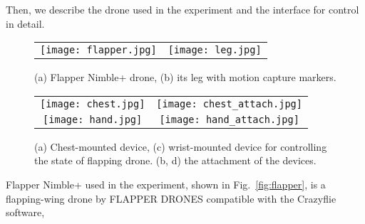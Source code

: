 Then, we describe the drone used in the experiment and the interface for control in detail.
\begin{figure}[b]
  \centering
  \begin{tabular}{cc}
      \begin{minipage}[t]{0.4 \columnwidth}
        \centering
        \texttt{[image: flapper.jpg]}
        \subcaption{}
        \label{fig:flapper}
      \end{minipage} &
      \begin{minipage}[t]{0.4 \columnwidth}
        \centering
        \texttt{[image: leg.jpg]}
        \subcaption{}
        \label{fig:leg}
      \end{minipage}
    \end{tabular}
  \caption{(a) Flapper Nimble+ drone, (b) its leg with motion capture markers.}
\end{figure}
\begin{figure}[!b]
  \centering
  \begin{tabular}{cc}
      \begin{minipage}[t]{0.4 \columnwidth}
        \centering
        \texttt{[image: chest.jpg]}
        \subcaption{}
        \label{fig:chest}
      \end{minipage} &
      \begin{minipage}[t]{0.4 \columnwidth}
        \centering
        \texttt{[image: chest\_attach.jpg]}
        \subcaption{}
        \label{fig:chest_attach}
      \end{minipage} \\
      \begin{minipage}[t]{0.4 \columnwidth}
        \centering
        \texttt{[image: hand.jpg]}
        \subcaption{}
        \label{fig:hand}
      \end{minipage} &
      \begin{minipage}[t]{0.4 \columnwidth}
        \centering
        \texttt{[image: hand\_attach.jpg]}
        \subcaption{}
        \label{fig:hand_attach}
      \end{minipage}
    \end{tabular}
  \caption{(a) Chest-mounted device, (c) wrist-mounted device for controlling the state of flapping drone. (b, d) the attachment of the devices.}
\end{figure}
Flapper Nimble+ \cite{company_product} used in the experiment, shown in Fig.~\ref{fig:flapper}, is a flapping-wing drone by FLAPPER DRONES compatible with the Crazyflie software, 
